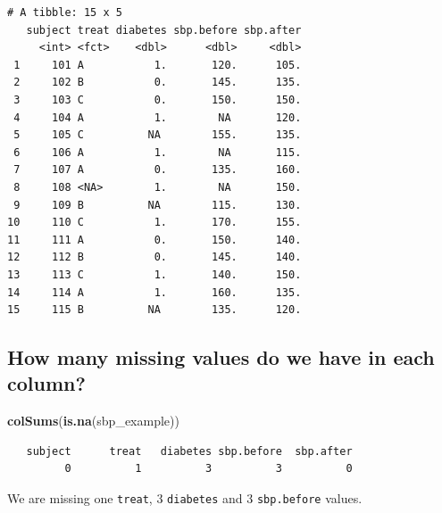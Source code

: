 \documentclass[]{book}
\newenvironment{Shaded}{\begin{snugshade}}{\end{snugshade}}
\newcommand{\KeywordTok}[1]{\textcolor[rgb]{0.13,0.29,0.53}{\textbf{#1}}}
\newcommand{\DataTypeTok}[1]{\textcolor[rgb]{0.13,0.29,0.53}{#1}}
\newcommand{\StringTok}[1]{\textcolor[rgb]{0.31,0.60,0.02}{#1}}
\newcommand{\CommentTok}[1]{\textcolor[rgb]{0.56,0.35,0.01}{\textit{#1}}}
\newcommand{\OperatorTok}[1]{\textcolor[rgb]{0.81,0.36,0.00}{\textbf{#1}}}
\newcommand{\NormalTok}[1]{#1}
\theoremstyle{definition}
\theoremstyle{definition}
\theoremstyle{definition}
\theoremstyle{remark}
\begin{document}
\begin{Shaded}
\end{Shaded}

\begin{verbatim}
# A tibble: 15 x 5
   subject treat diabetes sbp.before sbp.after
     <int> <fct>    <dbl>      <dbl>     <dbl>
 1     101 A           1.       120.      105.
 2     102 B           0.       145.      135.
 3     103 C           0.       150.      150.
 4     104 A           1.        NA       120.
 5     105 C          NA        155.      135.
 6     106 A           1.        NA       115.
 7     107 A           0.       135.      160.
 8     108 <NA>        1.        NA       150.
 9     109 B          NA        115.      130.
10     110 C           1.       170.      155.
11     111 A           0.       150.      140.
12     112 B           0.       145.      140.
13     113 C           1.       140.      150.
14     114 A           1.       160.      135.
15     115 B          NA        135.      120.
\end{verbatim}

\subsection{How many missing values do we have in each
column?}\label{how-many-missing-values-do-we-have-in-each-column}

\begin{Shaded}
\begin{Highlighting}[]
\KeywordTok{colSums}\NormalTok{(}\KeywordTok{is.na}\NormalTok{(sbp_example))}
\end{Highlighting}
\end{Shaded}

\begin{verbatim}
   subject      treat   diabetes sbp.before  sbp.after 
         0          1          3          3          0 
\end{verbatim}

We are missing one \texttt{treat}, 3 \texttt{diabetes} and 3
\texttt{sbp.before} values.
\end{document}
